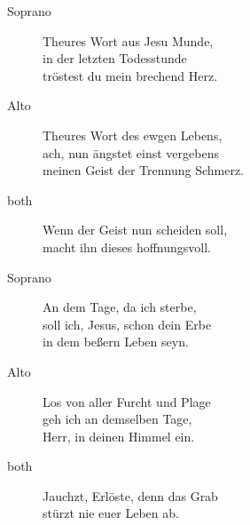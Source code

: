 \documentclass[parskip=full]{scrreprt}
\newif\iftemplate\templatetrue
\begin{document}
\begin{description}
	\item[Soprano]
	Theures Wort aus Jesu Munde,\\
	in der letzten Todesstunde\\
	tröstest du mein brechend Herz.
	
	\item[Alto]
	Theures Wort des ewgen Lebens,\\
	ach, nun ängstet einst vergebens\\
	meinen Geist der Trennung Schmerz.
	
	\item[both]
	Wenn der Geist nun scheiden soll,\\
	macht ihn dieses hoffnungsvoll.
	
	\item[Soprano]
	An dem Tage, da ich sterbe,\\
	soll ich, Jesus, schon dein Erbe\\
	in dem beßern Leben seyn.
	
	\item[Alto]
	Los von aller Furcht und Plage\\
	geh ich an demselben Tage,\\
	Herr, in deinen Himmel ein.
	
	\item[both]
	Jauchzt, Erlöste, denn das Grab\\
	stürzt nie euer Leben ab.
\end{description}


\cleardoublepage
\fi

\iftemplate

\fi
\end{document}
